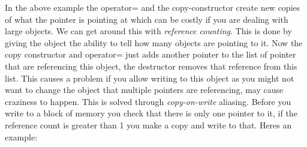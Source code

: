\documentclass[12pt]{article}
\begin{document}
In the above example the operator= and the copy-constructor create new copies of what the pointer is pointing at which can be costly if you are dealing with large objects. We can get around this with \textit{reference counting}. This is done by giving the object the ability to tell how many objects are pointing to it. Now the copy constructor and operator= just adds another pointer to the list of pointer that are referencing this object, the destructor removes that reference from this list. This causes a problem if you allow writing to this object as you might not want to change the object that multiple pointers are referencing, may cause craziness to happen. This is solved through \textit{copy-on-write} aliasing. Before you write to a block of memory you check that there is only one pointer to it, if the reference count is greater than 1 you make a copy and write to that. Heres an example:
\end{document}
